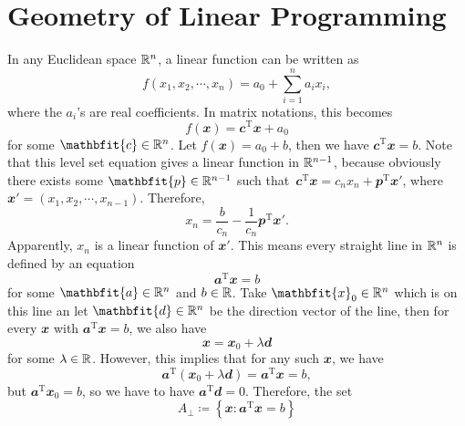 \documentclass[math, code]{amznotes}
\theoremstyle{remark}
\begin{document}
\section{Geometry of Linear Programming}
In any Euclidean space $\mathbb{R}^n$, a linear function can be written as 
\begin{equation*}
    f(x_1, x_2, \cdots, x_n) = a_0 + \sum_{i = 1}^{n}a_ix_i,
\end{equation*}
where the $a_i$'s are real coefficients. In matrix notations, this becomes
\begin{equation*}
    f(\mathbfit{x}) = \mathbfit{c}^{\mathrm{T}}\mathbfit{x} + a_0
\end{equation*}
for some $\mathbfit{c} \in \R^n$. Let $f(\mathbfit{x}) = a_0 + b$, then we have $\mathbfit{c}^{\mathrm{T}}\mathbfit{x} = b$. Note that this level set equation gives a linear function in $\mathbb{R}^{n - 1}$, because obviously there exists some $\mathbfit{p} \in \R^{n - 1}$ such that~$\mathbfit{c}^{\mathrm{T}}\mathbfit{x} = c_nx_n + \mathbfit{p}^{\mathrm{T}}\mathbfit{x'}$, where $\mathbfit{x}' = \left(x_1, x_2, \cdots, x_{n - 1}\right)$. Therefore,
\begin{equation*}
    x_n = \frac{b}{c_n} - \frac{1}{c_n}\mathbfit{p}^{\mathrm{T}}\mathbfit{x'}.
\end{equation*} 
Apparently, $x_n$ is a linear function of $\mathbfit{x}'$. This means every straight line in $\mathbb{R}^n$ is defined by an equation
\begin{equation*}
    \mathbfit{a}^{\mathrm{T}}\mathbfit{x} = b
\end{equation*}
for some $\mathbfit{a} \in \R^n$ and $b \in \mathbb{R}$. Take $\mathbfit{x}_0 \in \R^n$ which is on this line an let $\mathbfit{d} \in \R^n$ be the direction vector of the line, then for every $\mathbfit{x}$ with $\mathbfit{a}^{\mathrm{T}}\mathbfit{x} = b$, we also have 
\begin{equation*}
    \mathbfit{x} = \mathbfit{x}_0 + \lambda\mathbfit{d}
\end{equation*}
for some $\lambda \in \mathbb{R}$. However, this implies that for any such $\mathbfit{x}$, we have
\begin{equation*}
    \mathbfit{a}^{\mathrm{T}}(\mathbfit{x}_0 + \lambda\mathbfit{d}) = \mathbfit{a}^{\mathrm{T}}\mathbfit{x} = b,
\end{equation*}
but $\mathbfit{a}^{\mathrm{T}}\mathbfit{x}_0 = b$, so we have to have $\mathbfit{a}^{\mathrm{T}}\mathbfit{d} = 0$. Therefore, the set
\begin{equation*}
    A_{\perp} \coloneqq \left\{\mathbfit{x} \colon \mathbfit{a}^{\mathrm{T}}\mathbfit{x} = b\right\}
\end{equation*}
\end{document}
